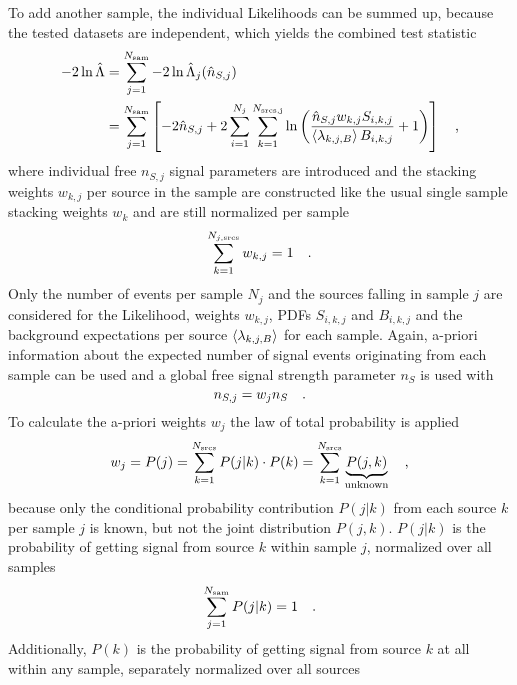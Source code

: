To add another sample, the individual Likelihoods can be summed up, because the tested datasets are independent, which yields the combined test statistic
\begin{align}
  -2\ln\hat{\Lambda}
  &= \sum_{j=1}^{N_\text{sam}} -2\ln\hat{\Lambda}_j(\hat{n}_{S,j}) \\
  &= \sum_{j=1}^{N_\text{sam}} \left[
        -2\hat{n}_{S,j} +
        2\sum_{i=1}^{N_j} \sum_{k=1}^{N_\text{srcs,j}} \ln\left(
          \frac{\hat{n}_{S,j} w_{k,j} S_{i,k,j}}
               {\Braket{\lambda_{k,j,B}} B_{i,k,j}}
          + 1
        \right)
      \right]
  \quad\text{,}
\end{align}
where individual free $n_{S,j}$ signal parameters are introduced and the stacking weights $w_{k,j}$ per source in the sample are constructed like the usual single sample stacking weights $w_k$ and are still normalized per sample
\begin{equation}
  \sum_{k=1}^{N_{j,\text{srcs}}} w_{k,j} = 1
  \quad\text{.}
\end{equation}
Only the number of events per sample $N_j$ and the sources falling in sample $j$ are considered for the Likelihood, weights $w_{k,j}$, PDFs $S_{i,k,j}$ and $B_{i,k,j}$ and the background expectations per source $\Braket{\lambda_{k,j,B}}$ for each sample.
Again, a-priori information about the expected number of signal events originating from each sample can be used and a global free signal strength parameter $n_S$ is used with
\begin{equation}
  n_{S,j} = w_j n_S
  \quad\text{.}
\end{equation}
To calculate the a-priori weights $w_j$ the law of total probability is applied 
\begin{equation}
  w_j = P(j) = \sum_{k=1}^{N_\text{srcs}} P(j|k)\cdot P(k)
  = \sum_{k=1}^{N_\text{srcs}} \underbrace{P(j,k)}_\text{unknown}
  \quad\text{,}
\end{equation}
because only the conditional probability contribution $P(j|k)$ from each source $k$ per sample $j$ is known, but not the joint distribution $P(j,k)$.
$P(j|k)$ is the probability of getting signal from source $k$ within sample $j$, normalized over all samples
\begin{equation}
  \sum_{j=1}^{N_\text{sam}} P(j|k) = 1
  \quad\text{.}
\end{equation}
Additionally, $P(k)$ is the probability of getting signal from source $k$ at all within any sample, separately normalized over all sources
